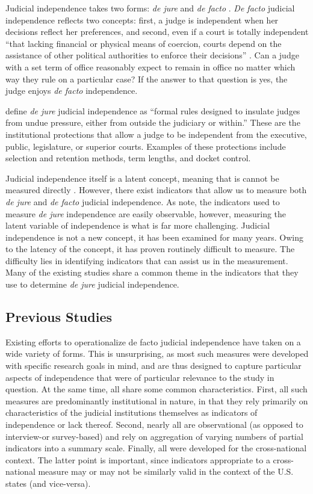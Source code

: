 \documentclass[JohnsonMADraft2.tex]{subfiles}
\begin{document}
Judicial independence takes two forms: \textit{de jure} and \textit{de facto} \citep{Feld2003,Rios2014, Rosenberg1991,Voeten2008}.  \textit{De facto} judicial independence reflects two concepts: first, a judge is independent when her decisions reflect her preferences, and second, even if a court is totally independent ``that lacking financial or physical means of coercion, courts depend on the assistance of other political authorities to enforce their decisions'' \citep[4]{Rios2014}. Can a judge with a set term of office reasonably expect to remain in office no matter which way they rule on a particular case? If the answer to that question is yes, the judge enjoys \textit{de facto} independence. 

\citet[3]{Rios2014} define \textit{de jure} judicial independence as ``formal rules designed to insulate judges from undue pressure, either from outside the judiciary or within.''  These are the institutional protections that allow a judge to be independent from the executive, public, legislature, or superior courts.  Examples of these protections include selection and retention methods, term lengths, and docket control.

Judicial independence itself is a latent concept, meaning that is cannot be measured directly \citep[203]{Treier2008}.  However, there exist indicators that allow us to measure both \textit{de jure} and \textit{de facto} judicial independence.  As \citet[5]{Rios2014} note, the indicators used to measure \textit{de jure} independence are easily observable, however, measuring the latent variable of independence is what is far more challenging.  Judicial independence is not a new concept, it has been examined for many years.  Owing to the latency of the concept, it has proven routinely difficult to measure.  The difficulty lies in identifying indicators that can assist us in the measurement.  Many of the existing studies share a common theme in the indicators that they use to determine \textit{de jure} judicial independence.  

\subsection*{Previous Studies}%
Existing efforts to operationalize de facto judicial independence have taken on a wide variety of forms. This is unsurprising, as most such measures were developed with specific research goals in mind, and are thus designed to capture particular aspects of independence that were of particular relevance to the study in question. At the same time, all share some common characteristics. First, all such measures are predominantly institutional in nature, in that they rely primarily on characteristics of the judicial institutions themselves as indicators of independence or lack thereof. Second, nearly all are observational (as opposed to interview-or survey-based) and rely on aggregation of varying numbers of partial indicators into a 
summary scale. Finally, all were developed for the cross-national context. The latter point is important, since indicators appropriate to a cross-national measure may or may not be similarly valid in the context of the U.S. states (and vice-versa).
\end{document}
